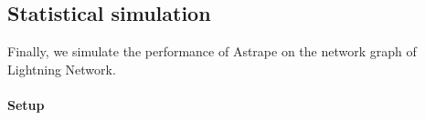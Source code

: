 \documentclass[USenglish,oneside,twocolumn]{article}
\begin{document}

\subsection{Statistical simulation}

Finally, we simulate the performance of Astrape on the network graph of Lightning Network.

\paragraph*{Setup}
\end{document}
